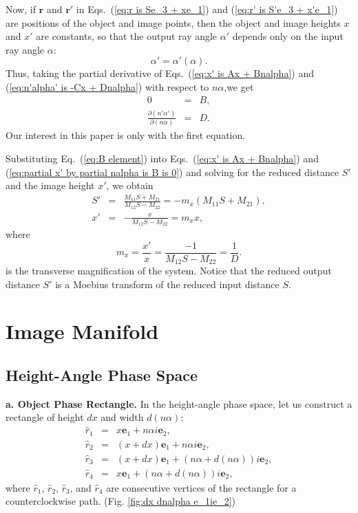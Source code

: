 \documentclass[11pt,twocolumn]{article}
\begin{document}
Now, if $\mathbf r$ and $\mathbf r'$ in Eqs.~(\ref{eq:r is Se_3 + xe_1}) and (\ref{eq:r' is S'e_3 + x'e_1}) are positions of the object and image points, then the object and image heights $x$ and $x'$ are constants, so that the output ray angle $\alpha'$ depends only on the input ray angle $\alpha$:
\begin{equation}
\label{eq:alpha' is alpha' of alpha}
\alpha'=\alpha'(\alpha).
\end{equation}
Thus, taking the partial derivative of Eqs.~(\ref{eq:x' is Ax + Bnalpha}) and (\ref{eq:n'alpha' is -Cx + Dnalpha}) with respect to $n\alpha$,we get
\begin{eqnarray}
\label{eq:partial x' by partial nalpha is B is 0}
0&=&B,\\
\label{eq:partial n'alpha' by partial nalpha is D}
\frac{\partial(n'\alpha')}{\partial(n\alpha)}&=&D.
\end{eqnarray}
Our interest in this paper is only with the first equation.

Substituting Eq.~(\ref{eq:B element}) into Eqs.~(\ref{eq:x' is Ax + Bnalpha}) and (\ref{eq:partial x' by partial nalpha is B is 0}) and solving for the reduced distance $S'$ and the image height $x'$, we obtain\cite{SugonMcNamara_2008_arXiv0812.0664v1_p8}
\begin{eqnarray}
\label{eq:r' e_3 part transform}
S'&=&\frac{M_{11}S+M_{21}}{M_{12}S-M_{22}}=-m_x(M_{11}S+M_{21}),\\
\label{eq:r' e_1 part transform}
x'&=&-\frac{x}{M_{12}S-M_{22}}=m_xx,
\end{eqnarray}
where
\begin{equation}
\label{eq:m_x is x' over x}
m_x=\frac{x'}{x}=\frac{-1}{M_{12}S-M_{22}}=\frac{1}{D}.
\end{equation}
is the transverse magnification of the system.  Notice that the reduced output distance $S'$ is a Moebius transform of the reduced input distance $S$.  


\section{Image Manifold}

\subsection{Height-Angle Phase Space}

\textbf{a.  Object Phase Rectangle.}  In the height-angle phase space, let us construct a rectangle of height $dx$ and width $d(n\alpha)$:
\begin{eqnarray}
\label{eq:r_1 height angle}
\hat r_1&=&x\mathbf e_1+n\alpha i\mathbf e_2,\\
\label{eq:r_2 height angle}
\hat r_2&=&(x+dx)\mathbf e_1+n\alpha i\mathbf e_2,\\
\label{eq:r_3 height angle}
\hat r_3&=&(x+dx)\mathbf e_1+(n\alpha +d(n\alpha))i\mathbf e_2,\\
\label{eq:r_4 height angle}
\hat r_4&=&x\mathbf e_1+(n\alpha +d(n\alpha))i\mathbf e_2,
\end{eqnarray}
where $\hat r_1$, $\hat r_2$, $\hat r_3$, and $\hat r_4$ are consecutive vertices of the rectangle for a counterclockwise path.  (Fig. \ref{fig:dx dnalpha e_1ie_2})
\end{document}
